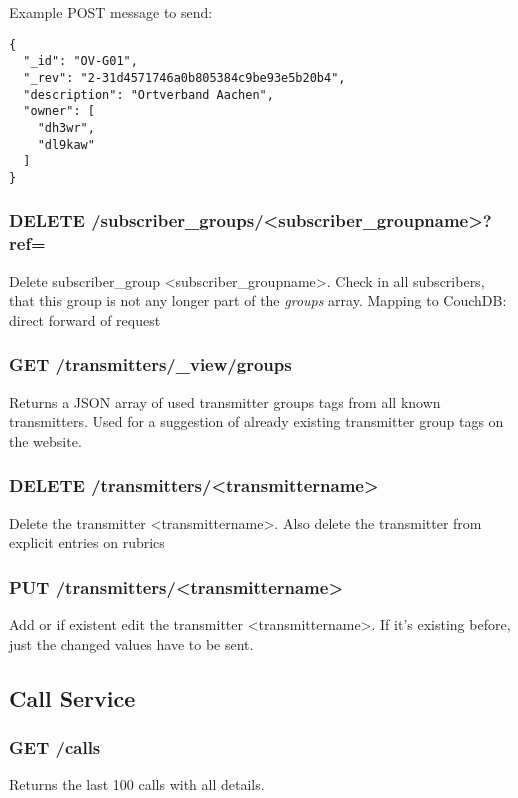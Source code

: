 Example POST message to send:
\begin{lstlisting}
{
  "_id": "OV-G01",
  "_rev": "2-31d4571746a0b805384c9be93e5b20b4",
  "description": "Ortverband Aachen",
  "owner": [
    "dh3wr",
    "dl9kaw"
  ]
}
\end{lstlisting}

\subsubsection{DELETE /subscriber\_groups/<subscriber\_groupname>?ref=}
Delete subscriber\_group <subscriber\_groupname>. Check in all subscribers, that this group is not any longer part of the \textit{groups} array.
Mapping to CouchDB: direct forward of request

\subsubsection{GET /transmitters/\_view/groups}
Returns a JSON array of used transmitter groups tags from all known transmitters. Used for a suggestion of already existing transmitter group tags on the website.

\subsubsection{DELETE /transmitters/<transmittername>}
Delete the transmitter <transmittername>. Also delete the transmitter from explicit entries on rubrics

\subsubsection{PUT /transmitters/<transmittername>}
Add or if existent edit the transmitter <transmittername>. If it's existing before, just the changed values have to be sent.

\subsection{Call Service}

\subsubsection{GET /calls}
Returns the last 100 calls with all details.

